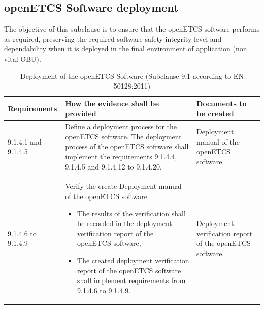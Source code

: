 \documentclass{template/openetcs_report}
\begin{document}
\subsection{openETCS Software deployment}
\begin{flushleft}
The objective of this subclause is to ensure that the openETCS software performs as required, preserving the required software safety integrity level and dependability when it is deployed in the final environment of application (non vital OBU).
\end{flushleft}
{\footnotesize\sffamily\centering
\begin{longtable}{|p{2cm}|p{9cm}|p{3cm}|}
\caption{Deployment of the openETCS Software (Subclause 9.1 according to EN 50128:2011)}\\
\hline
\bfseries Requirements & \bfseries How the evidence shall be provided & \bfseries Documents to be created\\
\hline
\hline
\endhead
\hline
\endfoot

9.1.4.1 and 9.1.4.5 & Define a deployment process for the openETCS software.
The deployment process of the openETCS software shall implement the requirements 9.1.4.4, 9.1.4.5 and 9.1.4.12 to 9.1.4.20.
& Deployment manual of the openETCS software.\\ 
\hline
9.1.4.6 to 9.1.4.9 & Verify the create Deployment manual of the openETCS software
\begin{itemize}\itemsep=0pt
  \item The results of the verification shall be recorded in the deployment verification report of the openETCS software,
  \item The created deployment verification report of the openETCS software shall implement requirements from 9.1.4.6 to 9.1.4.9. 
\end{itemize}
& Deployment verification report of the openETCS software.\\ 
\hline
\end{longtable}}
\end{document}
